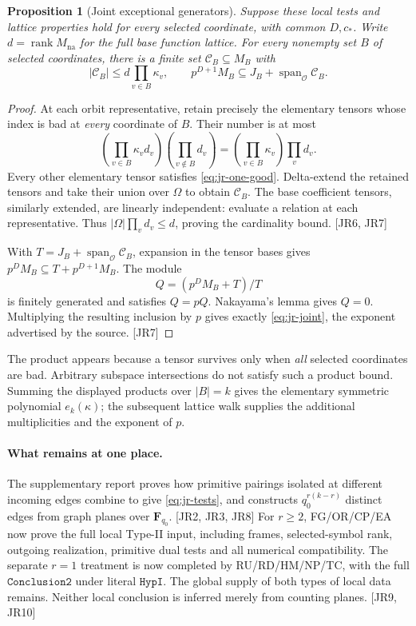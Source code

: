 \documentclass[11pt,a4paper]{article}
\numberwithin{equation}{section}
\newtheorem{proposition}[theorem]{Proposition}
\theoremstyle{remark}\newtheorem{remark}[theorem]{Remark}
\begin{document}
\begin{proposition}[Joint exceptional generators]\label{prop:jr-joint}
Suppose these local tests and lattice properties hold for every selected coordinate, with common $D,c_*$. Write $d=\operatorname{rank}M_{\mathrm{na}}$ for the full base function lattice. For every nonempty set $B$ of selected coordinates, there is a finite set $\mathcal C_B\subseteq M_B$ with
\begin{equation}\label{eq:jr-joint}
 |\mathcal C_B|\le d\prod_{v\in B}\kappa_v,
 \qquad
 p^{D+1}M_B\subseteq J_B+\operatorname{span}_{\mathcal O}\mathcal C_B.
\end{equation}
\end{proposition}
\begin{proof}
At each orbit representative, retain precisely the elementary tensors whose index is bad at \emph{every} coordinate of $B$. Their number is at most
\[
 \left(\prod_{v\in B}\kappa_vd_v\right)
 \left(\prod_{v\notin B}d_v\right)
   =\left(\prod_{v\in B}\kappa_v\right)\prod_v d_v.
\]
Every other elementary tensor satisfies \eqref{eq:jr-one-good}. Delta-extend the retained tensors and take their union over $\Omega$ to obtain $\mathcal C_B$. The base coefficient tensors, similarly extended, are linearly independent: evaluate a relation at each representative. Thus $|\Omega|\prod_vd_v\le d$, proving the cardinality bound. \textsf{[JR6, JR7]}

With $T=J_B+\operatorname{span}_{\mathcal O}\mathcal C_B$, expansion in the tensor bases gives $p^DM_B\subseteq T+p^{D+1}M_B$. The module
\[
 Q=(p^DM_B+T)/T
\]
is finitely generated and satisfies $Q=pQ$. Nakayama's lemma gives $Q=0$. Multiplying the resulting inclusion by $p$ gives exactly \eqref{eq:jr-joint}, the exponent advertised by the source. \textsf{[JR7]}
\end{proof}

The product appears because a tensor survives only when \emph{all} selected coordinates are bad. Arbitrary subspace intersections do not satisfy such a product bound. Summing the displayed products over $|B|=k$ gives the elementary symmetric polynomial $e_k(\kappa)$; the subsequent lattice walk supplies the additional multiplicities and the exponent of $p$.

\paragraph{What remains at one place.}
The supplementary report proves how primitive pairings isolated at different incoming edges combine to give \eqref{eq:jr-tests}, and constructs $q_0^{r(k-r)}$ distinct edges from graph planes over $\mathbf F_{q_0}$. \textsf{[JR2, JR3, JR8]} For $r\ge2$, FG/OR/CP/EA now prove the full local Type-II input, including frames, selected-symbol rank, outgoing realization, primitive dual tests and all numerical compatibility. The separate $r=1$ treatment is now completed by RU/RD/HM/NP/TC, with the full $\texttt{Conclusion2}$ under literal $\texttt{HypI}$. The global supply of both types of local data remains. Neither local conclusion is inferred merely from counting planes. \textsf{[JR9, JR10]}
\end{document}
